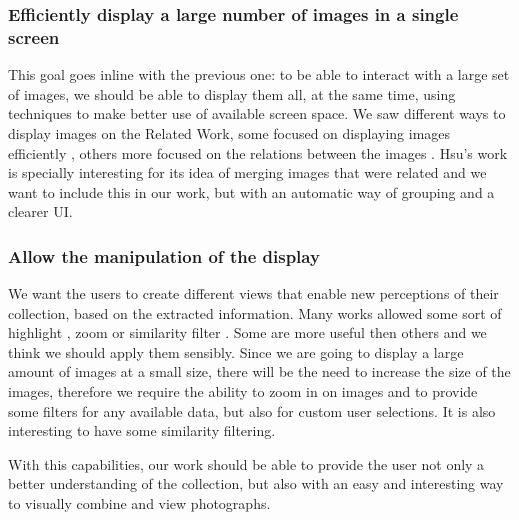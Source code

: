 \subsubsection{Efficiently display a large number of images in a single screen} %
This goal goes inline with the previous one: to be able to interact with a large set of images, we should be able to display them all, at the same time, using techniques to make better use of available screen space. We saw different ways to display images on the Related Work, some focused on displaying images efficiently \cite{Qiu:2007p1207,Rodden:2001p731,Naaman:2004p1802,Hsu:2009p2696,Bederson:2001:PZI:502348.502359}, others more focused on the relations between the images \cite{Girgensohn:2009:MOP:1502650.1502711,Heesch:2004p2675}. Hsu's work \cite{Hsu:2009p2696} is specially interesting for its idea of merging images that were related and we want to include this in our work, but with an automatic way of grouping and a clearer \ac{UI}.

\subsubsection{Allow the manipulation of the display}
We want the users to create different views that enable new perceptions of their collection, based on the extracted information. Many works allowed some sort of highlight \cite{Girgensohn:2009:MOP:1502650.1502711}, zoom \cite{Bederson:2001:PZI:502348.502359} or similarity filter \cite{Qiu:2007p1207,Heesch:2004p2675}. Some are more useful then others and we think we should apply them sensibly. Since we are going to display a large amount of images at a small size, there will be the need to increase the size of the images, therefore we require the ability to zoom in on images and to provide some filters for any available data, but also for custom user selections. It is also interesting to have some similarity filtering.
	
\vspace{\baselineskip}
	
With this capabilities, our work should be able to provide the user not only a better understanding of the collection, but also with an easy and interesting way to visually combine and view photographs.



